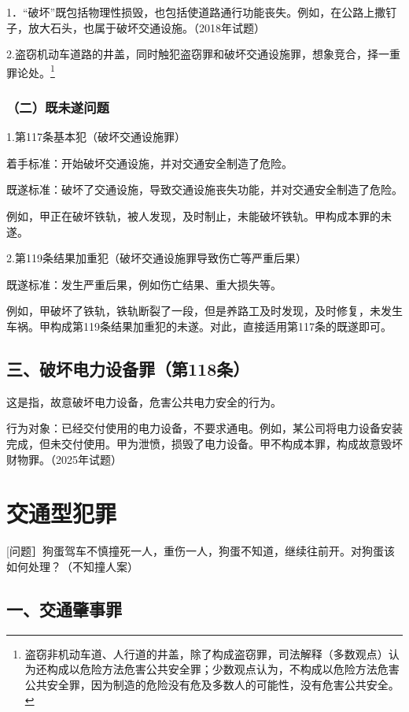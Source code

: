 1．“破坏”既包括物理性损毁，也包括使道路通行功能丧失。例如，在公路上撒钉子，放大石头，也属于破坏交通设施。（2018年试题）

2.盗窃机动车道路的井盖，同时触犯盗窃罪和破坏交通设施罪，想象竞合，择一重罪论处。\footnote{盗窃非机动车道、人行道的井盖，除了构成盗窃罪，司法解释（多数观点）认为还构成以危险方法危害公共安全罪；少数观点认为，不构成以危险方法危害公共安全罪，因为制造的危险没有危及多数人的可能性，没有危害公共安全。}

\subsubsection*{（二）既未遂问题}

1.第117条基本犯（破坏交通设施罪）

着手标准：开始破坏交通设施，并对交通安全制造了危险。

既遂标准：破坏了交通设施，导致交通设施丧失功能，并对交通安全制造了危险。

例如，甲正在破坏铁轨，被人发现，及时制止，未能破坏铁轨。甲构成本罪的未遂。

2.第119条结果加重犯（破坏交通设施罪导致伤亡等严重后果）

既遂标准：发生严重后果，例如伤亡结果、重大损失等。

例如，甲破坏了铁轨，铁轨断裂了一段，但是养路工及时发现，及时修复，未发生车祸。甲构成第119条结果加重犯的未遂。对此，直接适用第117条的既遂即可。

\subsection*{三、破坏电力设备罪（第118条）}

这是指，故意破坏电力设备，危害公共电力安全的行为。

行为对象：已经交付使用的电力设备，不要求通电。例如，某公司将电力设备安装完成，但未交付使用。甲为泄愤，损毁了电力设备。甲不构成本罪，构成故意毁坏财物罪。（2025年试题）

\section{交通型犯罪}

[问题］狗蛋驾车不慎撞死一人，重伤一人，狗蛋不知道，继续往前开。对狗蛋该如何处理？（不知撞人案）

\subsection*{一、交通肇事罪}

